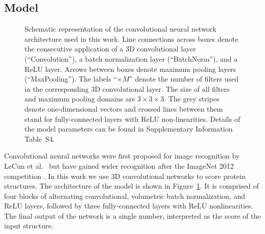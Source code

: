 \documentclass{bioinfo}
\begin{document}
\subsection{Model}
%
%
\begin{figure}[!tpb]
%
    \caption{Schematic representation of the convolutional neural
    network architecture used in this work. Line connections across
    boxes denote the consecutive application of a 3D convolutional
    layer (``Convolution''), a batch normalization layer
    (``BatchNorm''), and a ReLU layer. Arrows between boxes denote
    maximum pooling layers (``MaxPooling''). The labels ``$\times M$''
    denote the number of filters used in the corresponding 3D
    convolutional layer. The size of all filters and maximum pooling
    domains are $3\times 3\times 3$. The grey stripes denote
    one-dimensional vectors and crossed lines between them stand for
    fully-connected layers with ReLU non-linearities. Details of the
    model parameters can be found in Supplementary Information Table~S4.}
    \label{Fig:CNNModel}
\end{figure}
Convolutional neural networks were first proposed for image
recognition by LeCun et al.\ \citep{lecun1989backpropagation} but have
gained wider recognition after the ImageNet 2012
competition \citep{krizhevsky2012imagenet}. In this work we use 3D
convolutional networks to score protein structures. The architecture
of the model is shown in Figure~\ref{Fig:CNNModel}.  It is comprised of
four blocks of alternating convolutional, volumetric batch
normalization, and ReLU layers, followed by three fully-connected
layers with ReLU nonlinearities. The final output of the network is a
single number, interpreted as the score of the input structure.
\end{document}
